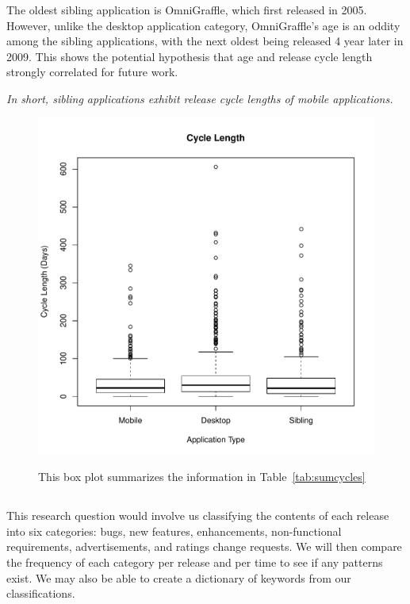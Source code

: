 \documentclass{acm_proc_article-sp}
\begin{document}
The oldest sibling application is OmniGraffle, which first released in 2005.
However, unlike the desktop application category, OmniGraffle's age is an oddity among the sibling applications, with the next oldest being released 4 year later in 2009. 
This shows the potential hypothesis that age and release cycle length strongly correlated for future work.

\textit{In short, sibling applications exhibit release cycle lengths of mobile applications.}



\begin{figure}
\begin{center}
\includegraphics[width=.5\textwidth]{CycleBoxPlot.pdf}
\label{fig:CycleBox}
\caption{This box plot summarizes the information in Table~\ref{tab:sumcycles}}
\end{center}
\end{figure}

\begin{center}

\label{tab:sumcycles}
\end{center}

\begin{center}

\label{tab:cycles}
\end{center}


\subsection{\RQThree }
This research question would involve us classifying the contents of each release into six categories: bugs, new features, enhancements, non-functional requirements, advertisements, and ratings change requests.
We will then compare the frequency of each category per release and per time to see if any patterns exist.
We may also be able to create a dictionary of keywords from our classifications.
\end{document}
